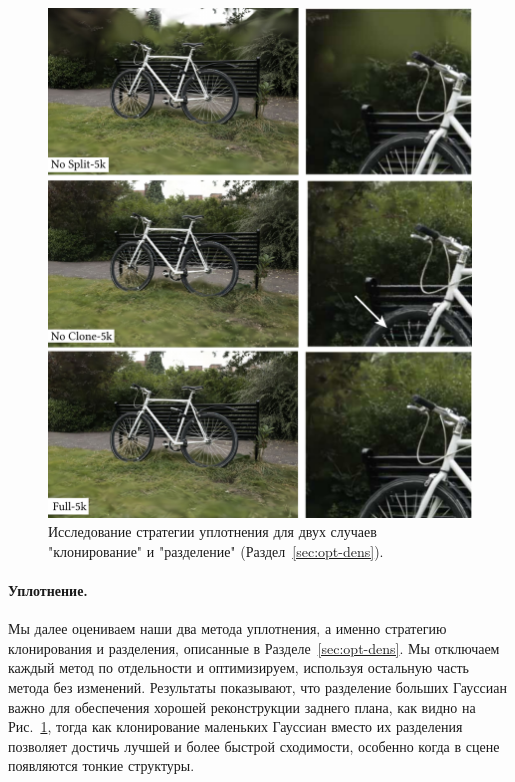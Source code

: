\begin{figure}[!h]
    \includegraphics[width=\linewidth]{figures/ablations/densification.pdf}
    \caption{
        \label{fig:densification_ablate}
        Исследование стратегии уплотнения для двух случаев "клонирование" и "разделение" (Раздел~\ref{sec:opt-dens}).
    }
\end{figure}

\paragraph{Уплотнение.}
Мы далее оцениваем наши два метода уплотнения, а именно стратегию клонирования и разделения, описанные в Разделе~\ref{sec:opt-dens}. Мы отключаем каждый метод по отдельности и оптимизируем, используя остальную часть метода без изменений. Результаты показывают, что разделение больших Гауссиан важно для обеспечения хорошей реконструкции заднего плана, как видно на Рис.~\ref{fig:densification_ablate}, тогда как клонирование маленьких Гауссиан вместо их разделения позволяет достичь лучшей и более быстрой сходимости, особенно когда в сцене появляются тонкие структуры.

